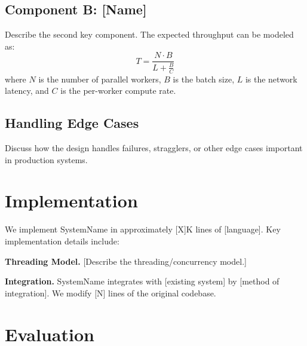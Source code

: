 \documentclass[letterpaper,twocolumn,10pt]{article}
\newcommand{\system}{SystemName\xspace}
\newcommand{\para}[1]{\smallskip\noindent\textbf{#1.}}
\begin{document}
\subsection{Component B: [Name]}

Describe the second key component. The expected throughput can be
modeled as:
\begin{equation}
  \label{eq:throughput}
  T = \frac{N \cdot B}{L + \frac{B}{C}}
\end{equation}
where $N$ is the number of parallel workers, $B$ is the batch size,
$L$ is the network latency, and $C$ is the per-worker compute rate.

\subsection{Handling Edge Cases}

Discuss how the design handles failures, stragglers, or other
edge cases important in production systems.

\section{Implementation}
\label{sec:implementation}


We implement \system in approximately [X]K lines of [language].
Key implementation details include:

\para{Threading Model}
[Describe the threading/concurrency model.]

\para{Integration}
\system integrates with [existing system] by [method of integration].
We modify [N] lines of the original codebase.

\section{Evaluation}
\label{sec:evaluation}

\end{document}
